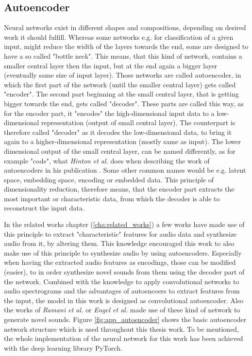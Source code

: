 \subsection{Autoencoder}
Neural networks exist in different shapes and compositions, depending on desired work it should fulfill. Whereas some networks e.g. for classification of a given input, might reduce the width of the layers towards the end, some are designed to have a so called "bottle neck". This means, that this kind of network, contains a smaller central layer then the input, but at the end again a bigger layer (eventually same size of input layer). \cite{hinton2006autoencoder} Those networks are called autoencoder, in which the first part of the network (until the smaller central layer) gets called "encoder". The second part beginning at the small central layer, that is getting bigger towards the end, gets called "decoder". These parts are called this way, as for the encoder part, it "encodes" the high-dimensional input data to a low-dimensional representation (output of small central layer). The counterpart is therefore called "decoder" as it decodes the low-dimensional data, to bring it again to a higher-dimensional representation (mostly same as input). The lower dimensional output of the small central layer, can be named differently, as for example "code", what \textit{Hinton et al.} does when describing the work of autoencoders in his publication \cite{hinton2006autoencoder}. Some other common names would be e.g. latent space, embedding space, encoding or embedded data. This principle of dimensionality reduction, therefore means, that the encoder part extracts the most important or characteristic data, from which the decoder is able to reconstruct the input data.

In the related works chapter (\ref{cha:related_works}) a few works have made use of this principle to extract "characteristic" features for audio data and synthesize audio from it, by altering them. This knowledge encouraged this work to also make use of this principle to synthesize audio by using autoencoders. Especially when having the extracted audio features as encodings, those can be modified (easier), to in order synthesize novel sounds from them using the decoder part of the network. 
Combined with the knowledge to apply convolutional networks to audio spectrograms and the advantages of autoencoers to extract features from the input, the model in this work is designed as convolutional autoencoder. Also the works of \textit{Ramani et al.} or \textit{Engel et al.} made use of these kind of network to generate novel sounds. Figure \ref{fig:app_autoencoder} shows the basic autoencoder network structure which is used throughout this thesis work. To be mentioned, the whole implementation of the neural network for this work has been achieved with the deep learning library PyTorch.\cite{paszke2019pytorch}

